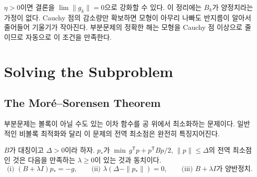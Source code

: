 $\eta>0$이면 결론을 $\lim\|g_k\|=0$으로 강화할 수 있다\cite{nocedal2006,conn2000trust}. 이 정리에는 $B_k$가 양정치라는 가정이 없다. Cauchy 점의 감소량만 확보하면 모형이 아무리 나빠도 반지름이 알아서 줄어들어 기울기가 작아진다. 부분문제의 정확한 해는 모형을 Cauchy 점 이상으로 줄이므로 자동으로 이 조건을 만족한다.

\section{Solving the Subproblem}
\label{sec:tr-subproblem}

\subsection{The Moré--Sorensen Theorem}

부분문제는 볼록이 아닐 수도 있는 이차 함수를 공 위에서 최소화하는 문제이다. 일반적인 비볼록 최적화와 달리 이 문제의 전역 최소점은 완전히 특징지어진다.

\begin{theorem}
\label{thm:more-sorensen}
$B$가 대칭이고 $\Delta>0$이라 하자. $p_\ast$가 $\min\,g^{\mathsf T}p+p^{\mathsf T}Bp/2$, $\|p\|\le\Delta$의 전역 최소점인 것은 다음을 만족하는 $\lambda\ge0$이 있는 것과 동치이다.
\[
\text{(i) }(B+\lambda I)p_\ast=-g,\qquad\text{(ii) }\lambda(\Delta-\|p_\ast\|)=0,\qquad\text{(iii) }B+\lambda I\text{가 양반정치.}
\]
\end{theorem}

